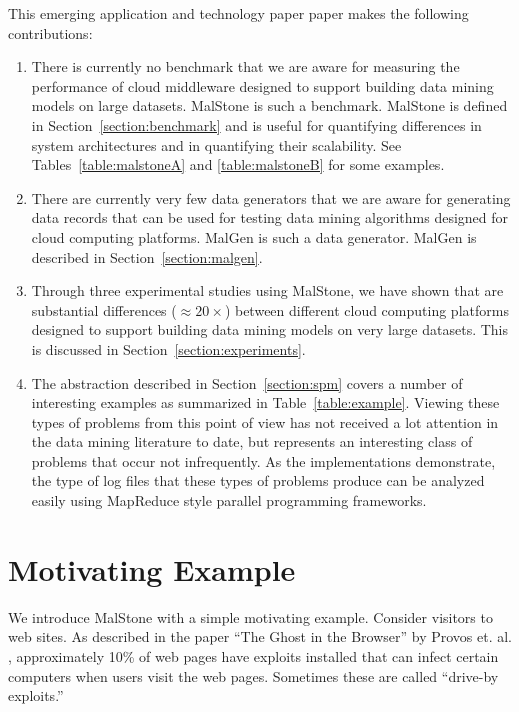\documentclass{acm_proc_article-sp}
\def\malstone{MalStone } \def\malgen{MalGen }
\def\malstonens{MalStone} \def\malgenns{MalGen}
\begin{document}
This emerging application and technology paper paper makes the
following contributions:

\begin{enumerate}

\item There is currently no benchmark that we are aware for measuring
  the performance of cloud middleware designed to support building
  data mining models on large datasets. \malstone is such a
  benchmark. \malstone is defined in Section~\ref{section:benchmark}
  and is useful for quantifying differences in system architectures
  and in quantifying their scalability. See
  Tables~\ref{table:malstoneA} and \ref{table:malstoneB} for some
  examples.

\item There are currently very few data generators that we are aware
  for generating data records that can be used for testing data mining
  algorithms designed for cloud computing platforms. \malgen is such
  a data generator. \malgen is described in
  Section~\ref{section:malgen}.

\item Through three experimental studies using \malstonens, we have
  shown that are substantial differences ($\approx 20\times$)
  between different cloud computing platforms designed to support
  building data mining models on very large datasets. This is
  discussed in Section~\ref{section:experiments}.

\item The abstraction described in Section~\ref{section:spm} covers a
  number of interesting examples as summarized in
  Table~\ref{table:example}. Viewing these types of problems from this
  point of view has not received a lot attention in the data mining
  literature to date, but represents an interesting class of problems
  that occur not infrequently. As the implementations demonstrate, the
  type of log files that these types of problems produce can be
  analyzed easily using MapReduce style parallel programming
  frameworks.

\end{enumerate}



\section{Motivating Example}
We introduce \malstone with a simple motivating example. Consider
visitors to web sites. As described in the paper ``The Ghost in the
Browser'' by Provos et. al. \cite{Provos:2007}, approximately 10\% of
web pages have exploits installed that can infect certain computers
when users visit the web pages. Sometimes these are called ``drive-by
exploits.''
\end{document}
